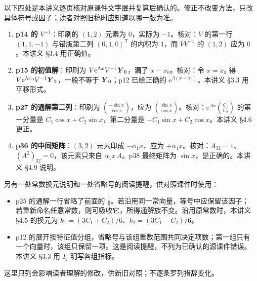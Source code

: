 \documentclass[11pt]{ctexart}
\let\basesubhdr\subhdr
\renewcommand{\subhdr}[1]{\needspace{8\baselineskip}\basesubhdr{#1}}
\newcommand{\ee}{\mathrm{e}}
\begin{document}

以下四处是本讲义逐页核对原课件文字层并复算后确认的。修正不改变方法，只改具体符号或因子；读者对照旧稿时应知道以哪一版为准。

\begin{enumerate}
  \item \textbf{p14 的 $V^{-1}$}：印刷的 $(1,2)$ 元素为 $0$，实际为 $-1$。核对：$V$ 的第一行 $(1,1,-1)$ 与错版第二列 $(0,1,0)^{\mathsf T}$ 的内积为 $1$，而 $VV^{-1}$ 的 $(1,2)$ 应为 $0$。本讲义 §3.4 用正确值。
  \item \textbf{p15 的初值解}：印刷为 $V\ee^{\Lambda x}V^{-1}\vect{Y}_0$，漏了 $x-x_0$。核对：令 $x=x_0$ 得 $V\ee^{\Lambda x_0}V^{-1}\vect{Y}_0$，一般不等于 $\boldsymbol{Y}_0$；p12 已给正确的 $\ee^{\Lambda(x-x_0)}$。本讲义 §3.3 用平移形式。
  \item \textbf{p27 的通解第二列}：印刷为 $\binom{-\sin x}{\cos x}$，应为 $\binom{\sin x}{\cos x}$。核对：$\ee^{Ax}\binom{C_1}{C_2}$ 的第一分量是 $C_1\cos x+C_2\sin x$，第二分量是 $-C_1\sin x+C_2\cos x$。本讲义 §4.6 更正。
  \item \textbf{p36 的中间矩阵}：$(3,2)$ 元素印成 $-\alpha_1x$，应为 $+\alpha_1x$。核对：$A_{32}=1$、$(A^2)_{32}=0$，该元素只来自 $\alpha_1x\,A$。p38 最终矩阵为 $\sin x$，是正确的。本讲义 §4.9 说明。
\end{enumerate}

另有一处常数换元说明和一处省略号的阅读提醒，供对照课件时使用：
\begin{itemize}
  \item p25 的通解一行省略了前面的 $\frac16$。若沿用同一常向量，等号中应保留该因子；若重新命名任意常数，则可吸收它，所得通解族不变。沿用原常数时，本讲义 §4.5 的换元为 $k_1=(3C_1+C_2)/6$、$k_2=(3C_1-C_2)/6$。
  \item p12 的展开按特征值分组，省略号与该组重数范围共同决定项数；第一组只有一个向量时，该组只保留一项。这是阅读提醒，不列为已确认的源课件错误。本讲义 §3.3 用 $I_j$ 明写各组指标。
\end{itemize}


这里只列会影响读者理解的修改，供新旧对照；不逐条罗列措辞变化。
\end{document}
